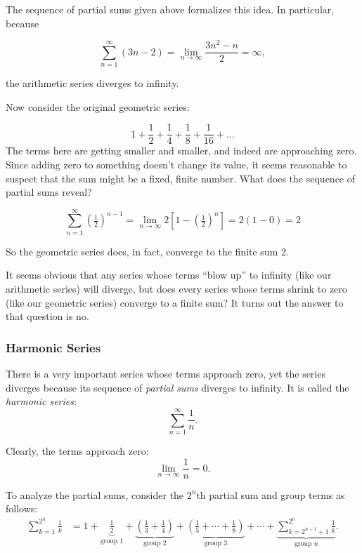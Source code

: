 The sequence of partial sums given above formalizes this idea. In particular, because


\[
\sum _{n=1}^{\infty} (3n-2) = \lim _{n\to\infty} \frac{3n^2-n}{2} = \infty,
\]

the arithmetic series diverges to infinity.


Now consider the original geometric series:


\[
1+\frac{1}{2}+\frac{1}{4}+\frac{1}{8}+\frac{1}{16}+\ldots
\] The terms here are getting smaller and smaller, and indeed are approaching zero. Since adding zero to something doesn't change its value, it seems reasonable to suspect that the sum might be a fixed, finite number. What does the sequence of partial sums reveal?


\[
\sum _{n=1}^{\infty} (\tfrac{1}{2})^{n-1} = \lim _{n\to\infty} 2[1-(\tfrac{1}{2})^n] = 2(1-0)=2
\]

So the geometric series does, in fact, converge to the finite sum 2.


It seems obvious that any series whose terms ``blow up'' to infinity (like our arithmetic series) will diverge, but does every series whose terms shrink to zero (like our geometric series) converge to a finite sum? It turns out the answer to that question is no.


\subsubsection{Harmonic Series}
\label{sss:harm-8fb1}

There is a very important series whose terms approach zero, yet the series 
diverges because its sequence of \textit{partial sums} diverges to infinity. 
It is called the \textit{harmonic series}:
\[
\sum_{n=1}^{\infty} \frac{1}{n}.
\]

Clearly, the terms approach zero:
\[
\lim_{n \to \infty} \frac{1}{n} = 0.
\]

To analyze the partial sums, consider the $2^n$th partial sum and group 
terms as follows:
\[
\begin{aligned}
\sum_{k=1}^{2^n} \frac{1}{k}
&= 1 
+ \underbrace{\frac{1}{2}}_{\text{group 1}} 
+ \underbrace{\left(\frac{1}{3} + \frac{1}{4}\right)}_{\text{group 2}} 
+ \underbrace{\left(\frac{1}{5} + \cdots + \frac{1}{8}\right)}_{\text{group 3}} 
+ \cdots 
+ \underbrace{\sum_{k=2^{n-1}+1}^{2^n} \frac{1}{k}}_{\text{group }n}.
\end{aligned}
\]


